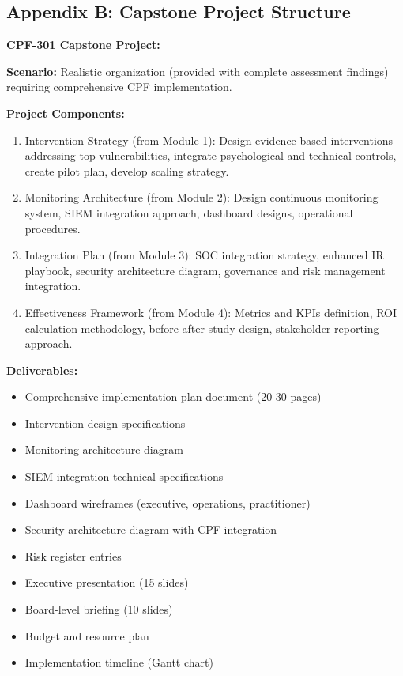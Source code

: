 \documentclass[11pt,a4paper]{article}
\begin{document}
\subsection{Appendix B: Capstone Project Structure}

\textbf{CPF-301 Capstone Project:}

\textbf{Scenario:} Realistic organization (provided with complete assessment findings) requiring comprehensive CPF implementation.

\textbf{Project Components:}
\begin{enumerate}
\item Intervention Strategy (from Module 1): Design evidence-based interventions addressing top vulnerabilities, integrate psychological and technical controls, create pilot plan, develop scaling strategy.
\item Monitoring Architecture (from Module 2): Design continuous monitoring system, SIEM integration approach, dashboard designs, operational procedures.
\item Integration Plan (from Module 3): SOC integration strategy, enhanced IR playbook, security architecture diagram, governance and risk management integration.
\item Effectiveness Framework (from Module 4): Metrics and KPIs definition, ROI calculation methodology, before-after study design, stakeholder reporting approach.
\end{enumerate}

\textbf{Deliverables:}
\begin{itemize}
\item Comprehensive implementation plan document (20-30 pages)
\item Intervention design specifications
\item Monitoring architecture diagram
\item SIEM integration technical specifications
\item Dashboard wireframes (executive, operations, practitioner)
\item Security architecture diagram with CPF integration
\item Risk register entries
\item Executive presentation (15 slides)
\item Board-level briefing (10 slides)
\item Budget and resource plan
\item Implementation timeline (Gantt chart)
\end{itemize}
\end{document}
